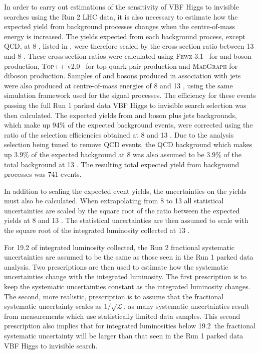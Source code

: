In order to carry out estimations of the sensitivity of \ac{VBF} Higgs to invisible searches using the Run 2 LHC data, it is also necessary to estimate how the expected yield from background processes changes when the centre-of-mass energy is increased. The yields expected from each background process, except \ac{QCD}, at 8 \TeV, listed in , were therefore scaled by the cross-section ratio between 13 and 8 \TeV. These cross-section ratios were calculated using \textsc{Fewz} 3.1~\cite{PhysRevD.86.094034} for \PW and \PZ boson production, \textsc{Top++} v2.0~\cite{Czakon20142930} for top quark pair production and \textsc{MadGraph} for diboson production. Samples of \PW and \PZ bosons produced in association with jets were also produced at centre-of-mass energies of 8 and 13 \TeV, using the same simulation framework used for the signal processes. The efficiency for these events passing the full Run 1 parked data \ac{VBF} Higgs to invisible search selection was then calculated. The expected yields from \PW and \PZ boson plus jets backgrounds, which make up 94\% of the expected background events, were corrected using the ratio of the selection efficiencies obtained at 8 and 13 \TeV. Due to the analysis selection being tuned to remove \ac{QCD} events, the \ac{QCD} background which makes up 3.9\% of the expected background at 8 \TeV was also assumed to be 3.9\% of the total background at 13 \TeV. The resulting total expected yield from background processes was 741 events.

In addition to scaling the expected event yields, the uncertainties on the yields must also be calculated. When extrapolating from 8 to 13 \TeV all statistical uncertainties are scaled by the square root of the ratio between the expected yields at 8 \TeV and 13 \TeV. The statistical uncertainties are then assumed to scale with the square root of the integrated luminosity collected at 13 \TeV.

For 19.2 \invfb of integrated luminosity collected, the Run 2 fractional systematic uncertainties are assumed to be the same as those seen in the Run 1 parked data analysis. Two prescriptions are then used to estimate how the systematic uncertainties change with the integrated luminosity. The first prescription is to keep the systematic uncertainties constant as the integrated luminosity changes. The second, more realistic, prescription is to assume that the fractional systematic uncertainty scales as $1/\sqrt{\mathcal{L}}$, as many systematic uncertainties result from measurements which use statistically limited data samples. This second prescription also implies that for integrated luminosities below 19.2 \invfb\,the fractional systematic uncertainty will be larger than that seen in the Run 1 parked data \ac{VBF} Higgs to invisible search.


